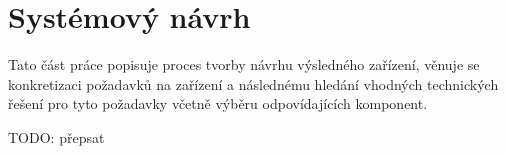 \chapter{Systémový návrh}

Tato část práce popisuje proces tvorby návrhu výsledného zařízení, věnuje se konkretizaci požadavků na zařízení a následnému hledání vhodných technických řešení pro tyto požadavky včetně výběru odpovídajících komponent.

TODO: přepsat













